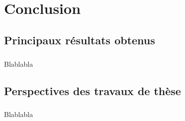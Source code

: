\chapter{Conclusion}

\section{Principaux résultats obtenus}
	\paragraph{} Blablabla

\section{Perspectives des travaux de thèse}

	\paragraph{} Blablabla
